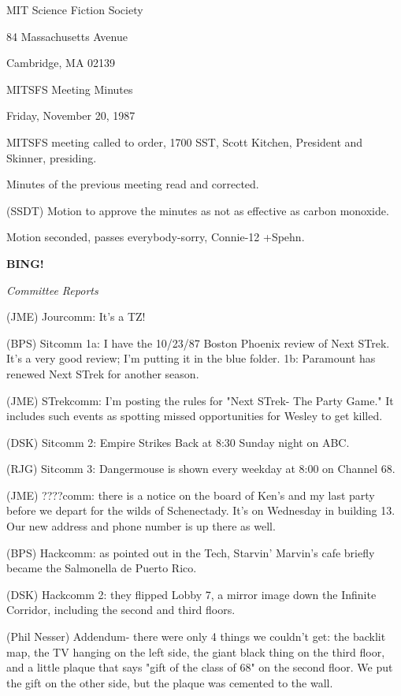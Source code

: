\documentclass[12pt]{article}
\newcommand{\bing}{{\bf BING!} }
\newcommand{\goto}[1]{\bing \vskip 12pt \centerline{{\em{#1}}}}
\begin{document}
\begin{center}

MIT Science Fiction Society 

84 Massachusetts Avenue

Cambridge, MA 02139

\vspace{12pt}

MITSFS Meeting Minutes 

Friday, November 20, 1987

\end{center}
 
\vspace{18pt}

\setlength{\parskip}{6pt}

\noindent
MITSFS meeting called to order, 1700 SST,
Scott Kitchen, President and Skinner, presiding.

Minutes of the previous meeting read and corrected.

(SSDT) Motion to approve the minutes as not as effective as carbon monoxide.

Motion seconded, passes everybody-sorry, Connie-12 +Spehn.

\goto{Committee Reports}

(JME) Jourcomm: It's a TZ!

(BPS) Sitcomm 1a: I have the 10/23/87 Boston Phoenix review of Next STrek. It's a very good review; I'm putting it in the blue folder. 1b: Paramount has renewed Next STrek for another season.

(JME) STrekcomm: I'm posting the rules for "Next STrek- The Party Game." It includes such events as spotting missed opportunities for Wesley to get killed.

(DSK) Sitcomm 2: Empire Strikes Back at 8:30 Sunday night on ABC.

(RJG) Sitcomm 3: Dangermouse is shown every weekday at 8:00 on Channel 68.

(JME) ????comm: there is a notice on the board of Ken's and my last party before we depart for the wilds of Schenectady. It's on Wednesday in building 13. Our new address and phone number is up there as well.

(BPS) Hackcomm: as pointed out in the Tech, Starvin' Marvin's cafe briefly became the Salmonella de Puerto Rico.

(DSK) Hackcomm 2: they flipped Lobby 7, a mirror image down the Infinite Corridor, including the second and third floors.

(Phil Nesser) Addendum- there were only 4 things we couldn't get: the backlit map, the TV hanging on the left side, the giant black thing on the third floor, and a little plaque that says "gift of the class of 68" on the second floor. We put the gift on the other side, but the plaque was cemented to the wall.
\end{document}
